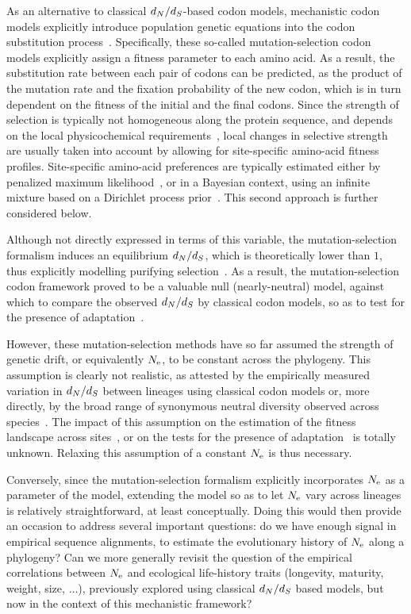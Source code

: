 \documentclass{article}
\begin{document}
    As an alternative to classical $d_N / d_S$-based {codon} models, mechanistic {codon} models explicitly introduce population genetic equations into the {codon} {substitution} process~\citep{Halpern1998}.
    Specifically, these so-called mutation-selection {codon} models explicitly assign a fitness parameter to each amino acid.
    As a result, the {substitution} rate between each pair of codons can be predicted, as the product of the mutation rate and the fixation probability of the new {codon}, which is in turn dependent on the fitness of the initial and the final codons.
    Since the strength of selection is typically not homogeneous along the protein sequence, and depends on the local physicochemical requirements~\citep{Echave2016, Goldstein2016,Goldstein2017}, local changes in selective strength are usually taken into account by allowing for site-specific amino-acid fitness profiles.
    Site-specific amino-acid preferences are typically estimated either by penalized maximum likelihood~\citep{Tamuri2012,Tamuri2014}, or in a Bayesian context, using an infinite mixture based on a {Dirichlet process} prior~\citep{Rodrigue2010,Rodrigue2014}.
    This second approach is further considered below.

    Although not directly expressed in terms of this variable, the mutation-selection formalism induces an equilibrium $d_N / d_S$, which is theoretically lower than $1$, thus explicitly modelling purifying selection~\citep{Spielman2015, DosReis2015}.
    As a result, the mutation-selection codon framework proved to be a valuable null (nearly-neutral) model, against which to compare the observed $d_N / d_S$ by classical {codon} models, so as to test for the presence of adaptation~\citep{Rodrigue2016, Bloom2017}.

    However, these mutation-selection methods have so far assumed the strength of {genetic drift}, or equivalently $N_{\text{e}}$, to be constant across the phylogeny.
    This assumption is clearly not realistic, as attested by the empirically measured variation in $d_N / d_S$ between lineages using classical {codon} models or, more directly, by the broad range of {synonymous} {neutral} diversity observed across species~\citep{Galtier2016}.
    The impact of this assumption on the estimation of the fitness landscape across sites~\citep{Tamuri2014, Rodrigue2014}, or on the tests for the presence of adaptation~\citep{Rodrigue2016, Bloom2017} is totally unknown.
    Relaxing this assumption of a constant $N_{\text{e}}$ is thus necessary.

    Conversely, since the mutation-selection formalism explicitly incorporates $N_{\text{e}}$ as a parameter of the model, extending the model so as to let $N_{\text{e}}$ vary across lineages is relatively straightforward, at least conceptually.
    Doing this would then provide an occasion to address several important questions: do we have enough signal in empirical sequence alignments, to estimate the evolutionary history of $N_{\text{e}}$ along a phylogeny?
    Can we more generally revisit the question of the empirical correlations between $N_{\text{e}}$ and ecological life-history traits (longevity, maturity, weight, size, $\hdots$), previously explored using classical $d_N / d_S$ based models, but now in the context of this mechanistic framework?
\end{document}

